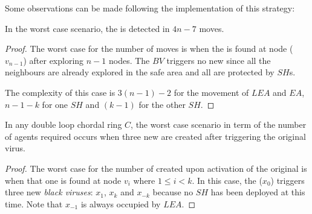 
\noindent Some observations can be made following the implementation of this strategy:

\begin{theorem}
In the worst case scenario, the \bv is detected in $4n-7$ moves.

\end{theorem}
\begin{proof}
The worst case for the number of moves is 
when the \bv  is found at node ($v_{n-1}$) after exploring   $n-1$ nodes.  
The $BV$ triggers no new \bvs since all the neighbours are already explored in the safe area and all are protected by $SH$s.

 
The complexity of this case is  $3(n-1)-2$ for the movement of $LEA$ and $EA$, $n-1-k$ for one $SH$ and $(k-1)$ for the other $SH$.
\end{proof}
%

%
\begin{theorem}

In any double loop chordal ring $C$, the worst case scenario in term of the number of agents required occurs when three new \bvs are created after triggering the original virus.
\end{theorem}

\begin{proof}
The worst case for the number of \bvs created upon activation of the original is when that one is found at node $v_i$ where $1 \leq i < k$. In this case, the \bv ($x_0$)  triggers three new {\it black viruses}:  $x_1$, $x_k$ and $x_{-k}$ because no $SH$ has been deployed at this time. Note that  $x_{-1} $ is always occupied by $LEA$.
\end{proof}
\begin{comment}
\begin{theorem}
The maximum number of agents employed to solve the problem is 12, 
and it corresponds to the case    $3$ new \bvs are created after triggering the original one.
 
\end{theorem}

\begin{proof}
The worst case for the number of cleaning agents and surrounding agents is when the \bv is at node $v_i$ where $1 \leq i < k$. In such a case, the \bv ($x_0$)  triggers 3 new {\it black viruses}:  $x_1$, $x_k$ and $x_{-k}$ because no $SH$ has been deployed yet. Note that  $x_{-1} $ is occupied by $LEA$. Therefore, the maximum number of  agents would be $12$: $8$ $SA$s and $4$ $CA$s.

\end{proof}

\end{comment}









